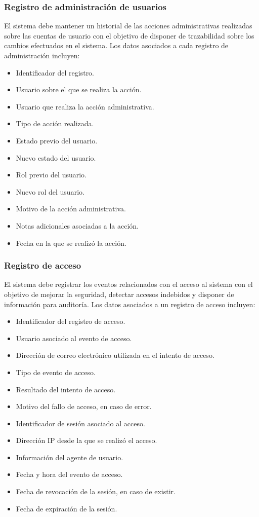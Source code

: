 \subsubsection*{Registro de administración de usuarios}

El sistema debe mantener un historial de las acciones administrativas realizadas sobre las cuentas de usuario con el objetivo de disponer de trazabilidad sobre los cambios efectuados en el sistema. Los datos asociados a cada registro de administración incluyen:

\begin{itemize}
    \item Identificador del registro.
    \item Usuario sobre el que se realiza la acción.
    \item Usuario que realiza la acción administrativa.
    \item Tipo de acción realizada.
    \item Estado previo del usuario.
    \item Nuevo estado del usuario.
    \item Rol previo del usuario.
    \item Nuevo rol del usuario.
    \item Motivo de la acción administrativa.
    \item Notas adicionales asociadas a la acción.
    \item Fecha en la que se realizó la acción.
\end{itemize}

\subsubsection*{Registro de acceso}

El sistema debe registrar los eventos relacionados con el acceso al sistema con el objetivo de mejorar la seguridad, detectar accesos indebidos y disponer de información para auditoría. Los datos asociados a un registro de acceso incluyen:

\begin{itemize}
    \item Identificador del registro de acceso.
    \item Usuario asociado al evento de acceso.
    \item Dirección de correo electrónico utilizada en el intento de acceso.
    \item Tipo de evento de acceso.
    \item Resultado del intento de acceso.
    \item Motivo del fallo de acceso, en caso de error.
    \item Identificador de sesión asociado al acceso.
    \item Dirección IP desde la que se realizó el acceso.
    \item Información del agente de usuario.
    \item Fecha y hora del evento de acceso.
    \item Fecha de revocación de la sesión, en caso de existir.
    \item Fecha de expiración de la sesión.
\end{itemize}

